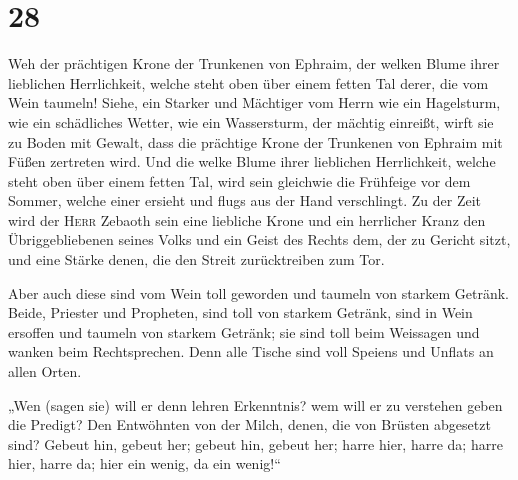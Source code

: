 \hypertarget{section-27}{%
\section{28}\label{section-27}}

 Weh der prächtigen Krone der Trunkenen von Ephraim, der
welken Blume ihrer lieblichen Herrlichkeit, welche steht oben über einem
fetten Tal derer, die vom Wein taumeln!  Siehe, ein
Starker und Mächtiger vom Herrn wie ein Hagelsturm, wie ein schädliches
Wetter, wie ein Wassersturm, der mächtig einreißt, wirft sie zu Boden
mit Gewalt,  dass die prächtige Krone der Trunkenen von
Ephraim mit Füßen zertreten wird.  Und die welke Blume
ihrer lieblichen Herrlichkeit, welche steht oben über einem fetten Tal,
wird sein gleichwie die Frühfeige vor dem Sommer, welche einer ersieht
und flugs aus der Hand verschlingt.  Zu der Zeit wird der
\textsc{Herr} Zebaoth sein eine liebliche Krone und ein herrlicher Kranz
den Übriggebliebenen seines Volks  und ein Geist des
Rechts dem, der zu Gericht sitzt, und eine Stärke denen, die den Streit
zurücktreiben zum Tor.

 Aber auch diese sind vom Wein toll geworden und taumeln
von starkem Getränk. Beide, Priester und Propheten, sind toll von
starkem Getränk, sind in Wein ersoffen und taumeln von starkem Getränk;
sie sind toll beim Weissagen und wanken beim Rechtsprechen.
 Denn alle Tische sind voll Speiens und Unflats an allen
Orten.

 „Wen (sagen sie) will er denn lehren Erkenntnis? wem will
er zu verstehen geben die Predigt? Den Entwöhnten von der Milch, denen,
die von Brüsten abgesetzt sind?  Gebeut hin, gebeut her;
gebeut hin, gebeut her; harre hier, harre da; harre hier, harre da; hier
ein wenig, da ein wenig!{}``

